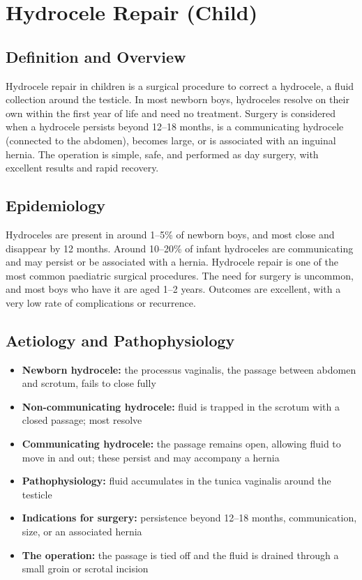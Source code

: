\chapter{Hydrocele Repair (Child)}

\section*{Definition and Overview}
Hydrocele repair in children is a surgical procedure to correct a hydrocele, a fluid collection around the testicle. In most newborn boys, hydroceles resolve on their own within the first year of life and need no treatment. Surgery is considered when a hydrocele persists beyond 12--18 months, is a communicating hydrocele (connected to the abdomen), becomes large, or is associated with an inguinal hernia. The operation is simple, safe, and performed as day surgery, with excellent results and rapid recovery.

\section*{Epidemiology}
Hydroceles are present in around 1--5\% of newborn boys, and most close and disappear by 12 months. Around 10--20\% of infant hydroceles are communicating and may persist or be associated with a hernia. Hydrocele repair is one of the most common paediatric surgical procedures. The need for surgery is uncommon, and most boys who have it are aged 1--2 years. Outcomes are excellent, with a very low rate of complications or recurrence.

\section*{Aetiology and Pathophysiology}
\begin{itemize}
    \item \textbf{Newborn hydrocele:} the processus vaginalis, the passage between abdomen and scrotum, fails to close fully
    \item \textbf{Non-communicating hydrocele:} fluid is trapped in the scrotum with a closed passage; most resolve
    \item \textbf{Communicating hydrocele:} the passage remains open, allowing fluid to move in and out; these persist and may accompany a hernia
    \item \textbf{Pathophysiology:} fluid accumulates in the tunica vaginalis around the testicle
    \item \textbf{Indications for surgery:} persistence beyond 12--18 months, communication, size, or an associated hernia
    \item \textbf{The operation:} the passage is tied off and the fluid is drained through a small groin or scrotal incision
\end{itemize}

